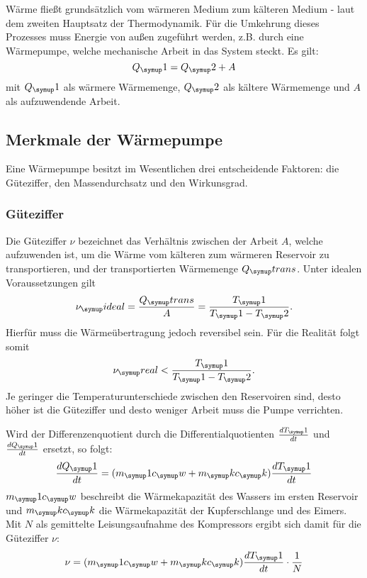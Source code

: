 Wärme fließt grundsätzlich vom wärmeren Medium zum kälteren Medium - laut dem
zweiten Hauptsatz der Thermodynamik. Für die Umkehrung dieses Prozesses muss
Energie von außen zugeführt werden, z.B. durch eine Wärmepumpe, welche mechanische
Arbeit in das System steckt. Es gilt:
\begin{equation}
  Q_\su{1} = Q_\su{2} + A
\end{equation}
mit $Q_\su{1}$ als wärmere Wärmemenge, $Q_\su{2}$ als kältere Wärmemenge und $A$ als
aufzuwendende Arbeit.
\subsection{Merkmale der Wärmepumpe}
Eine Wärmepumpe besitzt im Wesentlichen drei entscheidende Faktoren: die Güteziffer,
den Massendurchsatz und den Wirkunsgrad.
\subsubsection{Güteziffer}
Die Güteziffer $\nu$ bezeichnet das Verhältnis zwischen der Arbeit $A$, welche aufzuwenden
ist, um die Wärme vom kälteren zum wärmeren Reservoir zu transportieren, und der
transportierten Wärmemenge $Q_\su{trans}$. Unter idealen Voraussetzungen gilt
\begin{equation}
      \nu_\su{ideal} = \frac{Q_\su{trans}}{A} = \frac{T_\su{1}}{T_\su{1}-T_\su{2}}.
\end{equation}
Hierfür muss die Wärmeübertragung jedoch reversibel sein. Für die Realität folgt
somit
\begin{equation}
  \nu_\su{real} < \frac{T_\su{1}}{T_\su{1}-T_\su{2}}.
\end{equation}
Je geringer die Temperaturunterschiede zwischen den Reservoiren sind, desto höher ist
die Güteziffer und desto weniger Arbeit muss die Pumpe verrichten.

Wird der Differenzenquotient durch die Differentialquotienten $\frac{dT_\su{1}}{dt}$
und $\frac{dQ_\su{1}}{dt}$ ersetzt, so folgt:
\begin{equation}
  \frac{dQ_\su{1}}{dt}= (m_\su{1}c_\su{w}+m_\su{k}c_\su{k})\frac{dT_\su{1}}{dt}
\end{equation}
$m_\su{1}c_\su{w}$ beschreibt die Wärmekapazität des Wassers im ersten Reservoir und
$m_\su{k}c_\su{k}$ die Wärmekapazität der Kupferschlange und des Eimers. Mit $N$
als gemittelte Leisungsaufnahme des Kompressors ergibt sich damit für die Güteziffer
$\nu$:
\begin{equation}
  \nu = (m_\su{1}c_\su{w}+m_\su{k}c_\su{k})\frac{dT_\su{1}}{dt} \cdot \frac{1}{N}
\end{equation}
